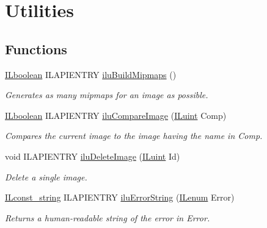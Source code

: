 \hypertarget{group__ilu__util}{\section{Utilities}
\label{group__ilu__util}
}
\subsection*{Functions}
\begin{DoxyCompactItemize}
\item 
\hyperlink{group__il__types_gaa6aa7c95cfdc06b4d8601ef832b7bb0a}{I\+Lboolean} I\+L\+A\+P\+I\+E\+N\+T\+R\+Y \hyperlink{group__ilu__util_ga7a8bbd9d1eae3c620a937b6cde501d38}{ilu\+Build\+Mipmaps} ()
\begin{DoxyCompactList}\small\item\em Generates as many mipmaps for an image as possible. \end{DoxyCompactList}\item 
\hyperlink{group__il__types_gaa6aa7c95cfdc06b4d8601ef832b7bb0a}{I\+Lboolean} I\+L\+A\+P\+I\+E\+N\+T\+R\+Y \hyperlink{group__ilu__util_gab39876b316fc278f23c3a62bb085eb48}{ilu\+Compare\+Image} (\hyperlink{group__il__types_gaff8e86a1072c8d7cfe387fb87c6ed8e1}{I\+Luint} Comp)
\begin{DoxyCompactList}\small\item\em Compares the current image to the image having the name in Comp. \end{DoxyCompactList}\item 
void I\+L\+A\+P\+I\+E\+N\+T\+R\+Y \hyperlink{group__ilu__util_gaf642c38dac816854d145940b5b0183ff}{ilu\+Delete\+Image} (\hyperlink{group__il__types_gaff8e86a1072c8d7cfe387fb87c6ed8e1}{I\+Luint} Id)
\begin{DoxyCompactList}\small\item\em Delete a single image. \end{DoxyCompactList}\item 
\hyperlink{group__il__types_ga1aa1edc3eb344e14acacb02bade24a5a}{I\+Lconst\+\_\+string} I\+L\+A\+P\+I\+E\+N\+T\+R\+Y \hyperlink{group__ilu__util_gaa899a04791dfb88d8b48c823998af427}{ilu\+Error\+String} (\hyperlink{group__il__types_ga62ca73445716183ef42b1f3906a45ed0}{I\+Lenum} Error)
\begin{DoxyCompactList}\small\item\em Returns a human-\/readable string of the error in {\itshape Error}. \end{DoxyCompactList}\item 

\end{DoxyCompactItemize}
